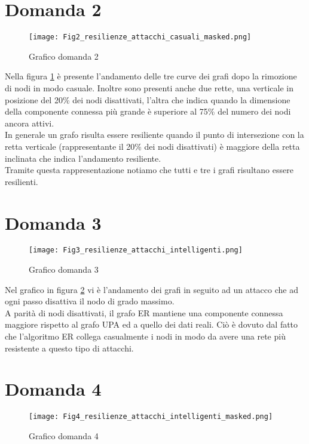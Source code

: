 \documentclass{article}
\begin{document}
\section*{Domanda 2}
\begin{figure}[h]
\texttt{[image: Fig2\_resilienze\_attacchi\_casuali\_masked.png]}
\caption{Grafico domanda 2}
\label{fig:graph2}
\end{figure}
Nella figura \ref{fig:graph2} è presente l'andamento delle tre curve dei grafi dopo la rimozione di nodi in modo casuale. Inoltre sono presenti anche due rette, una verticale in posizione del 20\% dei nodi disattivati, l'altra che indica quando la dimensione della componente connessa più grande è superiore al 75\% del numero dei nodi ancora attivi.\\
In generale un grafo risulta essere resiliente quando il punto di intersezione con la retta verticale (rappresentante il 20\% dei nodi disattivati) è maggiore della retta inclinata che indica l'andamento resiliente.\\Tramite questa rappresentazione notiamo che tutti e tre i grafi risultano essere resilienti.
\FloatBarrier
\section*{Domanda 3}
\begin{center}
\begin{figure}[h]
\texttt{[image: Fig3\_resilienze\_attacchi\_intelligenti.png]}
\caption{Grafico domanda 3}
\label{fig:graph3}
\end{figure}
\end{center}
Nel grafico in figura \ref{fig:graph3} vi è l'andamento dei grafi in seguito ad un attacco che ad ogni passo disattiva il nodo di grado massimo.\\A parità di nodi disattivati, il grafo ER mantiene una componente connessa maggiore rispetto al grafo UPA ed a quello dei dati reali.
Ciò è dovuto dal fatto che l'algoritmo ER collega casualmente i nodi in modo da avere una rete più resistente a questo tipo di attacchi.

\FloatBarrier

\section*{Domanda 4}
\begin{center}
\begin{figure}[h]
\texttt{[image: Fig4\_resilienze\_attacchi\_intelligenti\_masked.png]}
\caption{Grafico domanda 4}
\label{fig:graph4}
\end{figure}
\end{center}
\end{document}
